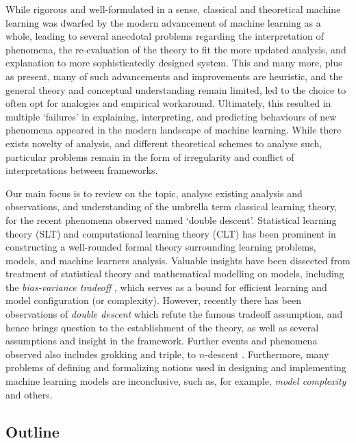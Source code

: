 While rigorous and well-formulated in a sense, classical and theoretical machine learning was dwarfed by the modern advancement of machine learning as a whole, leading to several anecdotal problems regarding the interpretation of phenomena, the re-evaluation of the theory to fit the more updated analysis, and explanation to more sophisticatedly designed system. This and many more, plus as present, many of such advancements and improvements are heuristic, and the general theory and conceptual understanding remain limited, led to the choice to often opt for analogies and empirical workaround. Ultimately, this resulted in multiple `failures' in explaining, interpreting, and predicting behaviours of new phenomena appeared in the modern landscape of machine learning. While there exists novelty of analysis, and different theoretical schemes to analyse such, particular problems remain in the form of irregularity and conflict of interpretations between frameworks. 

Our main focus is to review on the topic, analyse existing analysis and observations, and understanding of the umbrella term classical learning theory, for the recent phenomena observed named `double descent'. Statistical learning theory (SLT) and computational learning theory (CLT) \cite{Vapnik1999-VAPTNO,10.5555/2371238,10.5555/2621980,STL_Hajek_Maxim_2021,bousquet2020theoryuniversallearning} has been prominent in constructing a well-rounded formal theory surrounding learning problems, models, and machine learners analysis. Valuable insights have been dissected from treatment of statistical theory and mathematical modelling on models, including the \textit{bias-variance tradeoff} \cite{6797087,Domingos2000AUB}, which serves as a bound for efficient learning and model configuration (or complexity). However, recently there has been observations of \textit{double descent} \cite{belkin_reconciling_2019,schaeffer_double_2023,nakkiran_deep_2019,lafon_understanding_2024} which refute the famous tradeoff assumption, and hence brings question to the establishment of the theory, as well as several assumptions and insight in the framework. Further events and phenomena observed also includes grokking and triple, to $n$-descent \cite{davies_unifying_2023,d_ascoli_triple_2020}. Furthermore, many problems of defining and formalizing notions used in designing and implementing machine learning models are inconclusive, such as, for example, \textit{model complexity} and others. 

\subsection{Outline}

